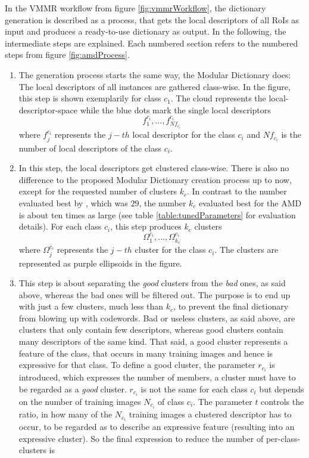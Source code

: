 In the VMMR workflow from figure \ref{fig:vmmrWorkflow}, the dictionary generation is described as a process, that gets the local descriptors of all RoIs as input and produces a ready-to-use dictionary as output. In the following, the intermediate steps are explained. Each numbered section refers to the numbered steps from figure \ref{fig:amdProcess}.
\begin{enumerate}
	\item The generation process starts the same way, the Modular Dictionary does: The local descriptors of all instances are gathered class-wise. In the figure, this step is shown exemplarily for class $c_1$. The cloud represents the local-descriptor-space while the blue dots mark the single local descriptors
	\begin{equation}\label{eq:descriptorsRoI}
	f_1^{c_i},\dots,f_{Nf_{c_i}}^{c_i}
	\end{equation}
where $f_j^{c_i}$ represents the $j-th$ local descriptor for the class $c_i$ and $Nf_{c_i}$ is the number of local descriptors of the class $c_i$.
	\item In this step, the local descriptors get clustered class-wise. There is also no difference to the proposed Modular Dictionary creation process up to now, except for the requested number of clusters $k_c$. In contrast to the number evaluated best by \citeauthor{siddiqui2015robust}, which was $29$, the number $k_c$ evaluated best for the AMD is about ten times as large (see table \ref{table:tunedParameters} for evaluation details). For each class $c_i$, this step produces $k_c$ clusters
	\begin{equation}\label{eq:clustersRoI}
	\Omega_1^{c_i},\dots,\Omega_{k_c}^{c_i}
	\end{equation}
where $\Omega_j^{c_i}$ represents the $j-th$ cluster for the class $c_i$. The clusters are represented as purple ellipsoids in the figure.
	\item This step is about separating the \emph{good} clusters from the \emph{bad} ones, as said above, whereas the bad ones will be filtered out. The purpose is to end up with just a few clusters, much less than $k_c$, to prevent the final dictionary from blowing up with codewords. Bad or useless clusters, as said above, are clusters that only contain few descriptors, whereas good clusters contain many descriptors of the same kind. That said, a good cluster represents a feature of the class, that occurs in many training images and hence is expressive for that class. To define a good cluster, the parameter $r_{c_i}$ is introduced, which expresses the number of members, a cluster must have to be regarded as a \emph{good} cluster. $r_{c_i}$ is not the same for each class $c_i$ but depends on the number of training images $N_{c_i}$ of class $c_i$. The parameter $t$ controls the ratio, in how many of the $N_{c_i}$ training images a clustered descriptor has to occur, to be regarded as to describe an expressive feature (resulting into an expressive cluster). So the final expression to reduce the number of per-class-clusters is

\end{enumerate}
